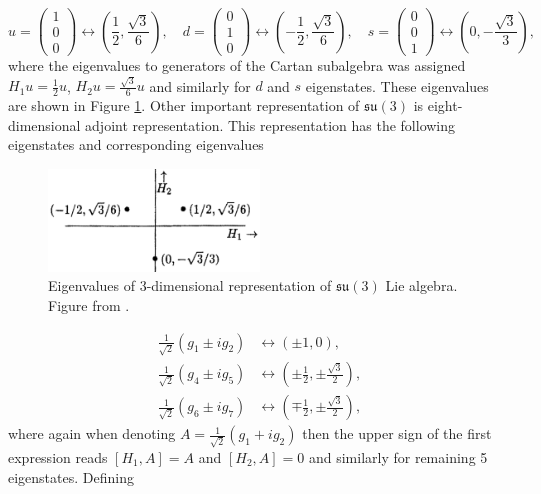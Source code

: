 \begin{equation}
  u = \begin{pmatrix} 1 \\ 0 \\ 0 \end{pmatrix} \leftrightarrow \left(
    \frac{1}{2}, \frac{\sqrt{3}}{6} \right), \quad
  d = \begin{pmatrix} 0 \\ 1 \\ 0 \end{pmatrix} \leftrightarrow \left(
    - \frac{1}{2}, \frac{\sqrt{3}}{6} \right), \quad
  s = \begin{pmatrix} 0 \\ 0 \\ 1 \end{pmatrix} \leftrightarrow \left(
    0, - \frac{\sqrt{3}}{3} \right), \quad
  \label{eq:RepresentLie3}
\end{equation}
where the eigenvalues to generators of the Cartan subalgebra was assigned $H_1 u
= \frac{1}{2} u$, $H_2 u = \frac{\sqrt{3}}{6} u$ and similarly for $d$ and $s$
eigenstates. These eigenvalues are shown in Figure \ref{fig:QuarkTriplet}. Other
important representation of $\mathfrak{su}(3)$ is eight-dimensional adjoint
representation. This representation has the following eigenstates and
corresponding eigenvalues

\begin{figure}
  \centering
  \includegraphics[width=0.5\textwidth]{Chapter1/Quark-triplet.png} 
  \caption{Eigenvalues of 3-dimensional representation of $\mathfrak{su}(3)$ Lie algebra. Figure
    from \cite{LieAlgebrasForParticlePhysicists}.}
  \label{fig:QuarkTriplet}
\end{figure}

\begin{align}
  \frac{1}{\sqrt{2}} \left( g_1 \pm i g_2  \right)
    &\leftrightarrow \left( \pm 1, 0 \right), \nonumber \\
  \frac{1}{\sqrt{2}} \left( g_4 \pm i g_5 \right) 
    &\leftrightarrow \left( \pm \frac{1}{2}, \pm \frac{\sqrt{3}}{2} \right), 
    \label{eq:RepresentLie8} \\
  \frac{1}{\sqrt{2}} \left( g_6 \pm i g_7 \right) 
    &\leftrightarrow \left( \mp \frac{1}{2}, \pm \frac{\sqrt{3}}{2} \right), \nonumber
\end{align}
where again when denoting $A = \frac{1}{\sqrt{2}} ( g_1 + i g_2 )$ then the
upper sign of the first expression reads $[ H_1, A ] = A$ and $[ H_2, A ] = 0$ and
similarly for remaining 5 eigenstates. Defining 

